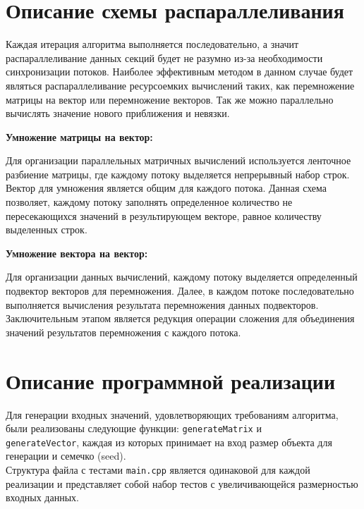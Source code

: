 \documentclass[14pt, russian]{extarticle}
\begin{document}
        \section{Описание схемы распараллеливания}
        Каждая итерация алгоритма выполняется последовательно, а значит распараллеливание данных секций будет не разумно из-за необходимости синхронизации потоков. Наиболее эффективным методом в данном случае будет являться распараллеливание ресурсоемких вычислений таких, как перемножение матрицы на вектор или перемножение векторов. Так же можно параллельно вычислять значение нового приближения и невязки.
        {\par\noindent\textbf{Умножение матрицы на вектор:}\\\indent}
        Для организации параллельных матричных вычислений используется ленточное разбиение матрицы, где каждому потоку выделяется непрерывный набор строк.
        Вектор для умножения является общим для каждого потока. Данная схема позволяет, каждому потоку заполнять определенное количество не пересекающихся значений в результирующем векторе, равное количеству выделенных строк.
        {\par\noindent\textbf{Умножение вектора на вектор:}\\\indent}
        Для организации данных вычислений, каждому потоку выделяется определенный подвектор векторов для перемножения. Далее, в каждом потоке последовательно выполняется вычисления результата перемножения данных подвекторов. Заключительным этапом является редукция операции сложения для объединения значений результатов перемножения с каждого потока.

        \newpage

        \section{Описание программной реализации}
        Для генерации входных значений, удовлетворяющих требованиям алгоритма, были реализованы следующие функции: \verb|generateMatrix| и \\ \verb|generateVector|, каждая из которых принимает на вход размер объекта для генерации и семечко (seed). \\
        Структура файла с тестами \verb|main.cpp| является одинаковой для каждой реализации и представляет собой набор тестов с увеличивающейся размерностью входных данных.
\end{document}
